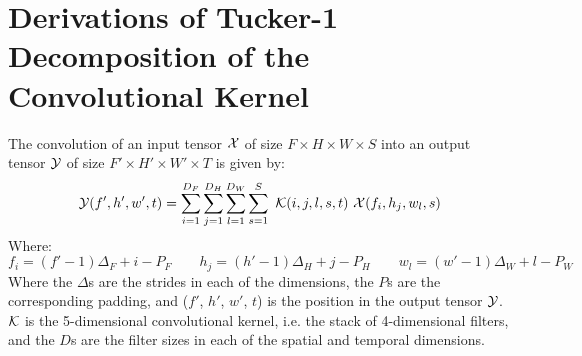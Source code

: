 \section{Derivations of Tucker-1 Decomposition of the Convolutional Kernel} \label{tex:tucker1_conv_derivations}
The convolution of an input tensor $\mathcal{X}$ of size $F\times H \times W \times S$ into an output tensor $\mathcal{Y}$ of size $F'\times H' \times W' \times T$ is given by:
\begin{equation}
    \tensor{Y}(f', h', w', t) = \sum_{i=1}^{D_F} \sum_{j=1}^{D_H} \sum_{l=1}^{D_W} \sum_{s=1}^{S} \ \tensor{K}(i, j, l, s, t) \ \tensor{X}(f_i, h_j, w_l, s)
    \label{eq:3d_convolution_appendix}
\end{equation}
Where:
\begin{equation}
    f_i = \left(f' - 1\right) \Delta_F + i - P_F \qquad h_j =  \left(h' - 1\right) \Delta_H + j - P_H \qquad w_l =  \left(w' - 1\right) \Delta_W + l - P_W
\end{equation}
Where the $\Delta$s are the strides in each of the dimensions, the $P$s are the corresponding padding, and ($f'$, $h'$, $w'$, $t$) is the position in the output tensor $\mathcal{Y}$. $\mathcal{K}$ is the 5-dimensional convolutional kernel, i.e. the stack of 4-dimensional filters, and the $D$s are the filter sizes in each of the spatial and temporal dimensions. 

